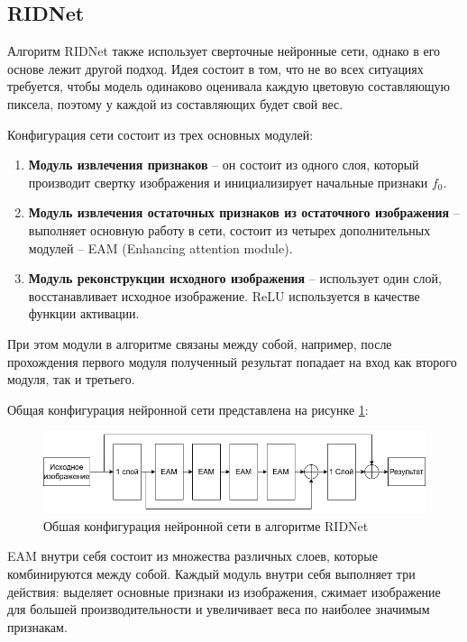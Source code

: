 \subsection{RIDNet}
Алгоритм RIDNet также использует сверточные нейронные сети, однако в его основе лежит другой подход.
Идея состоит в том, что не во всех ситуациях требуется, чтобы модель одинаково оценивала каждую цветовую составляющую пиксела, поэтому у каждой из составляющих будет свой вес.

Конфигурация сети состоит из трех основных модулей: 
\begin{enumerate}
	\item \textbf{Модуль извлечения признаков} -- он состоит из одного слоя, который производит свертку изображения и инициализирует начальные признаки $f_0$.
	\item \textbf{Модуль извлечения остаточных признаков из остаточного изображения} -- выполняет основную работу в сети, состоит из четырех дополнительных модулей -- EAM (Enhancing attention module).
	\item  \textbf{Модуль реконструкции исходного изображения} -- использует один слой, восстанавливает исходное изображение. ReLU используется в качестве функции активации.
\end{enumerate}

При этом модули в алгоритме связаны между собой, например, после прохождения первого модуля полученный результат попадает на вход как второго модуля, так и третьего.

Общая конфигурация нейронной сети представлена на рисунке \ref{fig::ridnetall}:
\FloatBarrier
\begin{figure}[h]	
	\begin{center}
		\includegraphics[width=\linewidth]{inc/png/ridnet.png}
	\end{center}
	\captionsetup{justification=centering}
	\caption{Обшая конфигурация нейронной сети в алгоритме RIDNet}
	\label{fig::ridnetall}
\end{figure}
\FloatBarrier

EAM внутри себя состоит из множества различных слоев, которые комбинируются между собой.
Каждый модуль внутри себя выполняет три действия: выделяет основные признаки из изображения, сжимает изображение для большей производительности и увеличивает веса по наиболее значимым признакам.

